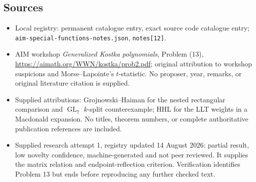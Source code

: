\documentclass[11pt]{article}
\begin{document}
\subsection{Sources}
\begin{itemize}
\item Local registry: permanent catalogue entry, exact source code catalogue entry; \texttt{aim-special-functions-notes.json}, \texttt{notes[12]}.
\item AIM workshop \emph{Generalized Kostka polynomials}, Problem (13), \url{https://aimath.org/WWN/kostka/prob2.pdf}; original attribution to workshop suspicions and Morse--Lapointe's $t$-statistic. No proposer, year, remarks, or original literature citation is supplied.
\item Supplied attributions: Grojnowski--Haiman for the nested rectangular comparison and $\operatorname{GL}_7$ $k$-split counterexample; HHL for the LLT weights in a Macdonald expansion. No titles, theorem numbers, or complete authoritative publication references are included.
\item Supplied research attempt 1, registry updated 14 August 2026: partial result, low novelty confidence, machine-generated and not peer reviewed. It supplies the matrix relation and endpoint-reflection criterion. Verification identifies Problem 13 but ends before reproducing any further checked text.
\end{itemize}
\end{document}
